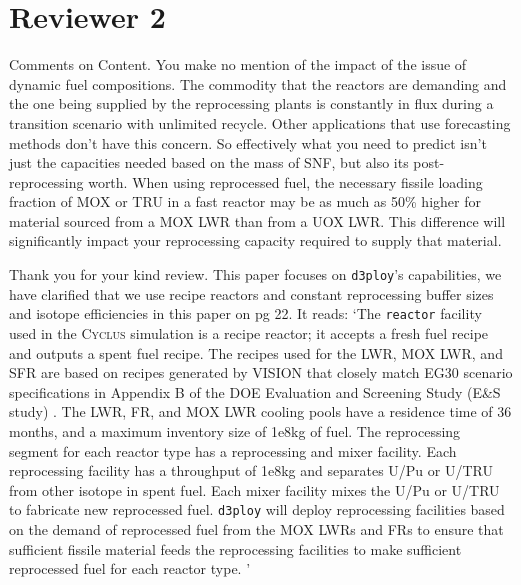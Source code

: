 \documentclass[answers,11pt]{exam}
\newcommand{\Cyclus}{\textsc{Cyclus}\xspace}%
\newcommand{\deploy}{\texttt{d3ploy}\xspace}%
\begin{document}
\section*{Reviewer 2}
\begin{questions}

\question Comments on Content.
You make no mention of the impact of the issue of dynamic fuel compositions. 
The commodity that the reactors are demanding and the one being supplied 
by the reprocessing plants is constantly in flux during a transition 
scenario with unlimited recycle. Other applications that use forecasting 
methods don't have this concern.  So effectively what you need to predict 
isn't just the capacities needed based on the mass of SNF, but also its 
post-reprocessing worth. When using reprocessed fuel, the necessary fissile 
loading fraction of MOX or TRU in a fast reactor may be as much as 50\% 
higher for material sourced from a MOX LWR than from a UOX LWR. 
This difference will significantly impact your reprocessing capacity 
required to supply that material.

\begin{solution}
Thank you for your kind review.
This paper focuses on \deploy's capabilities, we have clarified that we use recipe reactors 
and constant reprocessing buffer sizes and isotope efficiencies in this paper on pg 22. It reads: 
`The \texttt{reactor} facility used in the \Cyclus simulation 
is a recipe reactor; it accepts a fresh fuel recipe and outputs 
a spent fuel recipe. 
The recipes used for the LWR, MOX LWR, and 
SFR are based on recipes generated by VISION 
\cite{bae_arfctransition-scenarios_2019}
that closely match EG30 scenario specifications in 
Appendix B of the DOE Evaluation and Screening Study 
(E\&S study) \cite{wigeland_nuclear_2014}. 
The LWR, FR, and MOX LWR cooling pools have a residence time of 36 months, and a maximum 
inventory size of 1e8kg of fuel. 
The reprocessing segment for each reactor type has a reprocessing and mixer facility. 
Each reprocessing facility has a throughput of 1e8kg and separates U/Pu or U/TRU from 
other isotope in spent fuel. 
Each mixer facility mixes the U/Pu or U/TRU to fabricate new reprocessed fuel.  
\deploy will deploy reprocessing facilities based on the demand of reprocessed fuel 
from the MOX LWRs and FRs to ensure that sufficient fissile material 
feeds the reprocessing facilities to make sufficient reprocessed fuel 
for each reactor type. ' 


\end{solution}
\end{questions}
\end{document}
